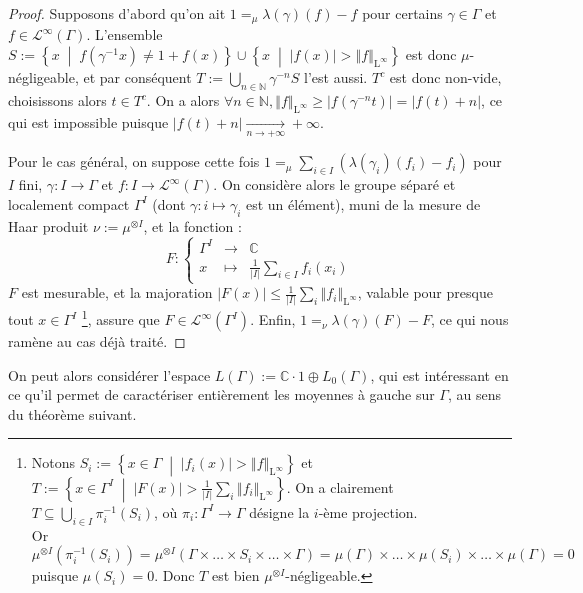 \documentclass[a4paper,12pt]{article}
\newcommand{\N}{\mathbb{N}}
\newcommand{\C}{\mathbb{C}}
\newcommand{\norm}[1]{\left\Vert #1\right\Vert}
\newcommand{\abs}[1]{\left\vert#1\right\vert}
\newcommand{\card}[1]{\abs{#1}}
\newcommand{\set}[1]{\left\{ #1 \right\}}
\newcommand{\indic}{\mathbbm{1}}
\newcommand\fundef[3]{#1: \left\{\begin{array}{ccc}#2\\#3\end{array}\right.}
\newcommand{\tq}{\;\middle|\;}
\newcommand{\inv}{^{-1}}
\newcommand{\compl}{^c}
\newcommand{\TODO}[1]{{\color{red}TODO :} #1}
\begin{document}
\begin{proof}
    Supposons d'abord qu'on ait $1 =_\mu \lambda(\gamma)(f) - f$ pour certains $\gamma\in\Gamma$ et 
    $f\in \mathscr{L}^\infty(\Gamma)$. L'ensemble $S:=\set{x\tq f(\gamma\inv x)\ne 1+f(x)}\cup\set{x\tq\abs{f(x)}>\norm{f}_{\mathrm{L}^\infty}}$ est donc $\mu$-négligeable,
    et par conséquent $T := \bigcup_{n\in\N}\gamma^{-n}S$ l'est aussi. $T\compl$ est donc non-vide, choisissons alors $t\in T\compl$. On a alors 
    $\forall n\in\N, \norm{f}_{\mathrm{L}^\infty}\geq \abs{f(\gamma^{-n}t)} = \abs{f(t) + n}$, ce qui est impossible puisque $\abs{f(t) + n}\xrightarrow[n\to+\infty]{}+\infty$.

    Pour le cas général, on suppose cette fois $1 =_\mu \sum_{i\in I} (\lambda(\gamma_i)(f_i) - f_i)$ pour $I$ fini, $\gamma : I \to\Gamma$ et
    $f : I\to \mathscr{L}^\infty(\Gamma)$. On considère alors le groupe séparé et localement compact $\Gamma^I$ (dont $\gamma : i\mapsto \gamma_i$ est
    un élément), muni de la mesure de Haar produit $\nu:=\mu^{\otimes I}$, et la fonction : 
    \begin{equation*}
        \fundef{F}{\Gamma^I&\to&\C}{x&\mapsto&\frac{1}{\card{I}}\sum_{i\in I}f_i(x_i)}
    \end{equation*}
    $F$ est mesurable, et la majoration
    $\abs{F(x)}\le\frac1{\card{I}}\sum_i\norm{f_i}_{\mathrm{L}^\infty}$, valable pour presque tout $x\in\Gamma^I$
    \footnote{Notons $S_i:=\set{x\in\Gamma\tq \abs{f_i(x)}>\norm{f}_{\mathrm{L}^\infty}}$ et $T:=\set{x\in\Gamma^I\tq \abs{F(x)}>\frac1{\card{I}}\sum_i\norm{f_i}_{\mathrm{L}^\infty}}$. 
        On a clairement $T\subseteq\bigcup_{i\in I}\pi_i\inv(S_i)$, où $\pi_i:\Gamma^I\to\Gamma$ désigne la $i$-ème projection. \\
        Or $\mu^{\otimes I}(\pi_i\inv(S_i)) = \mu^{\otimes I}(\Gamma\times\dots\times S_i\times\dots\times\Gamma)=\mu(\Gamma)\times\dots\times\mu(S_i)\times\dots\times\mu(\Gamma)=0$ puisque $\mu(S_i)=0$.
        Donc $T$ est bien $\mu^{\otimes I}$-négligeable.},
    assure que $F\in \mathscr{L}^\infty(\Gamma^I)$. 
    Enfin, $1 =_{\nu} \lambda(\gamma)(F) - F$, ce qui nous ramène au cas déjà traité. 
\end{proof}

On peut alors considérer l'espace $L(\Gamma) := \C\cdot 1 \oplus L_0(\Gamma)$, qui est intéressant en ce qu'il permet de caractériser entièrement
les moyennes à gauche sur $\Gamma$, au sens du théorème suivant.
\end{document}
